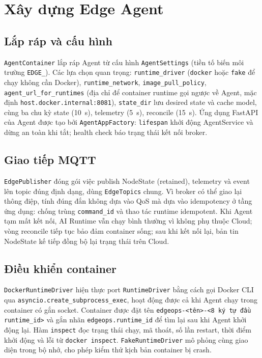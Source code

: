 \section{Xây dựng Edge Agent}

\subsection{Lắp ráp và cấu hình}

\texttt{AgentContainer} lắp ráp Agent từ cấu hình \texttt{AgentSettings} (tiền tố
biến môi trường \texttt{EDGE\_}). Các lựa chọn quan trọng: \texttt{runtime\_driver}
(\texttt{docker} hoặc \texttt{fake} để chạy không cần Docker), \texttt{runtime\_network},
\texttt{image\_pull\_policy}, \texttt{agent\_url\_for\_runtimes} (địa chỉ để container
runtime gọi ngược về Agent, mặc định \texttt{host.docker.internal:8081}),
\texttt{state\_dir} lưu desired state và cache model, cùng ba chu kỳ state (10~s),
telemetry (5~s), reconcile (15~s). Ứng dụng FastAPI của Agent được tạo bởi
\texttt{AgentAppFactory}: \texttt{lifespan} khởi động AgentService và dừng an
toàn khi tắt; health check báo trạng thái kết nối broker.

\subsection{Giao tiếp MQTT}

\texttt{EdgePublisher} đóng gói việc publish NodeState (retained), telemetry và
event lên topic đúng định dạng, dùng \texttt{EdgeTopics} chung. Vì broker có thể
giao lại thông điệp, tính đúng đắn không dựa vào QoS mà dựa vào idempotency ở
tầng ứng dụng: chống trùng \texttt{command\_id} và thao tác runtime idempotent.
Khi Agent tạm mất kết nối, AI Runtime vẫn chạy bình thường vì không phụ thuộc
Cloud; vòng reconcile tiếp tục bảo đảm container sống; sau khi kết nối lại, bản
tin NodeState kế tiếp đồng bộ lại trạng thái trên Cloud.

\subsection{Điều khiển container}

\texttt{DockerRuntimeDriver} hiện thực port \texttt{RuntimeDriver} bằng cách gọi
Docker CLI qua \texttt{asyncio.create\_subprocess\_exec}, hoạt động được cả khi
Agent chạy trong container có gắn socket. Container được đặt tên
\texttt{edgeops-<tên>-<8 ký tự đầu runtime\_id>} và gắn nhãn
\texttt{edgeops.runtime\_id} để tìm lại sau khi Agent khởi động lại. Hàm
\texttt{inspect} đọc trạng thái chạy, mã thoát, số lần restart, thời điểm khởi
động và lỗi từ \texttt{docker inspect}. \texttt{FakeRuntimeDriver} mô phỏng cùng
giao diện trong bộ nhớ, cho phép kiểm thử kịch bản container bị crash.

